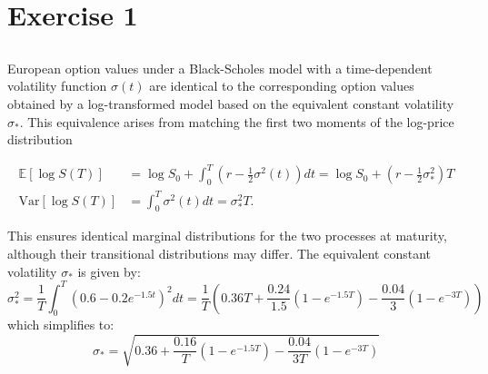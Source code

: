 \section{Exercise 1}

\subsection{}


European option values under a Black-Scholes model with a time-dependent volatility function $\sigma(t)$ are identical to the corresponding option values obtained by a log-transformed model based on the equivalent constant volatility $\sigma_*$. This equivalence arises from matching the first two moments of the log-price distribution

\begin{align*}
\mathbb{E}[\log S(T)] &= \log S_0 + \int_0^T \left(r - \frac{1}{2} \sigma^2(t)\right) dt = \log S_0 + \left(r - \frac{1}{2} \sigma_*^2\right) T \\
\mathrm{Var}[\log S(T)] &= \int_0^T \sigma^2(t) dt = \sigma_*^2 T.
\end{align*}

This ensures identical marginal distributions for the two processes at maturity, although their transitional distributions may differ. The equivalent constant volatility $\sigma_*$ is given by:
\begin{equation}
\sigma_*^2 = \frac{1}{T} \int_0^T \left(0.6 - 0.2 e^{-1.5t}\right)^2 dt = \frac{1}{T}\left(0.36T + \frac{0.24}{1.5}(1 - e^{-1.5T}) - \frac{0.04}{3}(1 - e^{-3T})\right)
\end{equation}
which simplifies to:
\begin{equation}
\sigma_* = \sqrt{0.36 + \frac{0.16}{T}(1 - e^{-1.5T}) - \frac{0.04}{3T}(1 - e^{-3T})}
\label{eq:sigma_star}
\end{equation}

